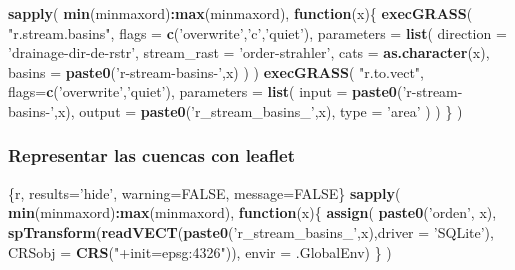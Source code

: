 \documentclass[11pt,]{article}
\newenvironment{Shaded}{\begin{snugshade}}{\end{snugshade}}
\newcommand{\KeywordTok}[1]{\textcolor[rgb]{0.13,0.29,0.53}{\textbf{#1}}}
\newcommand{\DataTypeTok}[1]{\textcolor[rgb]{0.13,0.29,0.53}{#1}}
\newcommand{\StringTok}[1]{\textcolor[rgb]{0.31,0.60,0.02}{#1}}
\newcommand{\OtherTok}[1]{\textcolor[rgb]{0.56,0.35,0.01}{#1}}
\newcommand{\ControlFlowTok}[1]{\textcolor[rgb]{0.13,0.29,0.53}{\textbf{#1}}}
\newcommand{\OperatorTok}[1]{\textcolor[rgb]{0.81,0.36,0.00}{\textbf{#1}}}
\newcommand{\NormalTok}[1]{#1}
\begin{document}
\begin{Shaded}
\begin{Highlighting}[]
\KeywordTok{sapply}\NormalTok{(}
  \KeywordTok{min}\NormalTok{(minmaxord)}\OperatorTok{:}\KeywordTok{max}\NormalTok{(minmaxord),}
  \ControlFlowTok{function}\NormalTok{(x)\{}
    \KeywordTok{execGRASS}\NormalTok{(}
      \StringTok{"r.stream.basins"}\NormalTok{,}
      \DataTypeTok{flags =} \KeywordTok{c}\NormalTok{(}\StringTok{'overwrite'}\NormalTok{,}\StringTok{'c'}\NormalTok{,}\StringTok{'quiet'}\NormalTok{),}
      \DataTypeTok{parameters =} \KeywordTok{list}\NormalTok{(}
        \DataTypeTok{direction =} \StringTok{'drainage-dir-de-rstr'}\NormalTok{,}
        \DataTypeTok{stream_rast =} \StringTok{'order-strahler'}\NormalTok{,}
        \DataTypeTok{cats =} \KeywordTok{as.character}\NormalTok{(x),}
        \DataTypeTok{basins =} \KeywordTok{paste0}\NormalTok{(}\StringTok{'r-stream-basins-'}\NormalTok{,x)}
\NormalTok{      )}
\NormalTok{    )}
    \KeywordTok{execGRASS}\NormalTok{(}
      \StringTok{"r.to.vect"}\NormalTok{,}
      \DataTypeTok{flags=}\KeywordTok{c}\NormalTok{(}\StringTok{'overwrite'}\NormalTok{,}\StringTok{'quiet'}\NormalTok{),}
      \DataTypeTok{parameters =} \KeywordTok{list}\NormalTok{(}
         \DataTypeTok{input =} \KeywordTok{paste0}\NormalTok{(}\StringTok{'r-stream-basins-'}\NormalTok{,x),}
         \DataTypeTok{output =} \KeywordTok{paste0}\NormalTok{(}\StringTok{'r_stream_basins_'}\NormalTok{,x),}
         \DataTypeTok{type =} \StringTok{'area'}
\NormalTok{      )}
\NormalTok{    )}
\NormalTok{  \}}
\NormalTok{)}
\end{Highlighting}
\end{Shaded}

\subsubsection{Representar las cuencas con
leaflet}\label{representar-las-cuencas-con-leaflet}

\begin{Shaded}
\begin{Highlighting}[]
\NormalTok{\{r, results=}\StringTok{'hide'}\NormalTok{, warning=}\OtherTok{FALSE}\NormalTok{, message=}\OtherTok{FALSE}\NormalTok{\}}
\KeywordTok{sapply}\NormalTok{(}
  \KeywordTok{min}\NormalTok{(minmaxord)}\OperatorTok{:}\KeywordTok{max}\NormalTok{(minmaxord),}
  \ControlFlowTok{function}\NormalTok{(x)\{}
    \KeywordTok{assign}\NormalTok{(}
      \KeywordTok{paste0}\NormalTok{(}\StringTok{'orden'}\NormalTok{, x),}
      \KeywordTok{spTransform}\NormalTok{(}\KeywordTok{readVECT}\NormalTok{(}\KeywordTok{paste0}\NormalTok{(}\StringTok{'r_stream_basins_'}\NormalTok{,x),}\DataTypeTok{driver =} \StringTok{'SQLite'}\NormalTok{), }\DataTypeTok{CRSobj =} \KeywordTok{CRS}\NormalTok{(}\StringTok{"+init=epsg:4326"}\NormalTok{)),}
      \DataTypeTok{envir =}\NormalTok{ .GlobalEnv)}
\NormalTok{  \}}
\NormalTok{)}
\end{Highlighting}
\end{Shaded}
\end{document}
